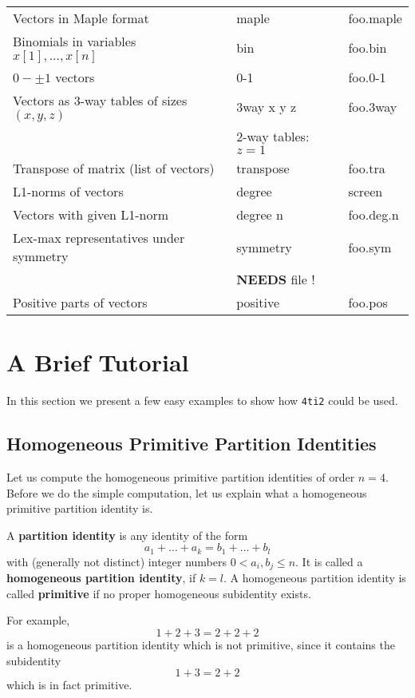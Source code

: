 \documentclass[12pt]{article}
\newcommand\File{\begingroup \urlstyle{sf}\Url}
\theoremstyle{definition}
\newcommand{\important}{\textbf}
\newcommand{\FourTiTwo}{{\tt 4ti2}}
\begin{document}
\begin{tabular}{lll}
Vectors in Maple format & maple & foo.maple\\
Binomials in variables $x[1],...,x[n]$ & bin & foo.bin\\
$0-\pm 1$ vectors & 0-1 & foo.0-1\\
Vectors as $3$-way tables of sizes $(x,y,z)$ & 3way x y z & foo.3way\\ 
	& $2$-way tables: $z=1$ &\\
Transpose of matrix (list of vectors) & transpose & foo.tra\\
L1-norms of vectors & degree & screen\\
Vectors with given L1-norm & degree n & foo.deg.n\\
Lex-max representatives under symmetry & symmetry & foo.sym\\
	& \important{NEEDS} file \File{foo.sym}! &\\
Positive parts of vectors & positive & foo.pos\\
\end{tabular}






\section{A Brief Tutorial}
In this section we present a few easy examples to show how 
\FourTiTwo{} could be used.

\subsection{Homogeneous Primitive Partition Identities}
Let us compute the homogeneous primitive partition identities of order
$n=4$. Before we do the simple computation, let us explain what a
homogeneous primitive partition identity is.

A \important{partition identity} is any identity of the form
\[
a_1+\ldots+a_k=b_1+\ldots+b_l
\]
with (generally not distinct) integer numbers $0<a_i,b_j\leq n$. It is
called a \important{homogeneous partition identity}, if $k=l$. A homogeneous
partition identity is called \important{primitive} if no proper homogeneous
subidentity exists.

For example, 
\[
1+2+3=2+2+2
\]
is a homogeneous partition identity which is not primitive, since it
contains the subidentity
\[
1+3=2+2
\]
which is in fact primitive.
\end{document}
